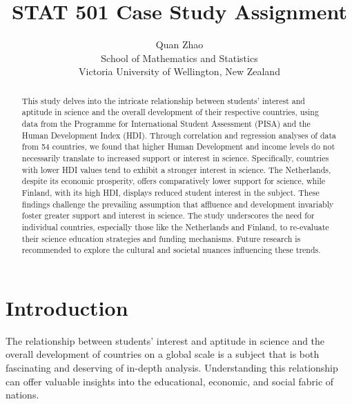 \documentclass[12pt]{article}
\title{STAT 501 Case Study Assignment}
\author{Quan Zhao\\
School of Mathematics and Statistics\\ Victoria University of Wellington, New Zealand}
\begin{document}
\maketitle

\begin{abstract}
  This study delves into the intricate relationship between students' interest and aptitude in science and the overall development of their respective countries, using data from the Programme for International Student Assessment (PISA) and the Human Development Index (HDI). Through correlation and regression analyses of data from 54 countries, we found that higher Human Development and income levels do not necessarily translate to increased support or interest in science. Specifically, countries with lower HDI values tend to exhibit a stronger interest in science. The Netherlands, despite its economic prosperity, offers comparatively lower support for science, while Finland, with its high HDI, displays reduced student interest in the subject. These findings challenge the prevailing assumption that affluence and development invariably foster greater support and interest in science. The study underscores the need for individual countries, especially those like the Netherlands and Finland, to re-evaluate their science education strategies and funding mechanisms. Future research is recommended to explore the cultural and societal nuances influencing these trends.
\end{abstract}









\section{Introduction}

\label{s.intro}

The relationship between students' interest and aptitude in science and the overall development of countries on a global scale is a subject that is both fascinating and deserving of in-depth analysis. Understanding this relationship can offer valuable insights into the educational, economic, and social fabric of nations.
\end{document}
